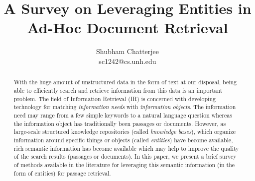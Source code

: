 \documentclass{article}
\title{ A Survey on Leveraging Entities in Ad-Hoc Document Retrieval}
\author{
Shubham Chatterjee \\ sc1242@cs.unh.edu
}
\begin{document}
\maketitle

\begin{abstract}
With the huge amount of unstructured data in the form of text at our disposal, being able to efficiently search and retrieve information from this data is an important problem. The field of Information Retrieval (IR) is concerned with developing technology for matching \textit{information needs} with \textit{information objects}\cite{balog2018entity}. The information need may range from a few simple keywords to a natural language question whereas the information object has traditionally been passages or documents. However, as large-scale structured knowledge repositories (called \textit{knowledge bases}), which organize information around specific things or objects (called \textit{entities}) have become available, rich semantic information has become available which may help to improve the quality of the search results (passages or documents). In this paper, we present a brief survey of methods available in the literature for leveraging this semantic information (in the form of entities) for passage retrieval.  


\end{abstract}
\vskip 32pt
\end{document}
